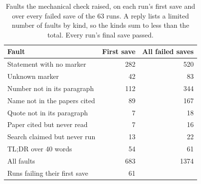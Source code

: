 \begin{table}[H]
\caption{Faults the mechanical check raised, on each run's first save and over every failed save of the 63 runs. A reply lists a limited number of faults by kind, so the kinds sum to less than the total. Every run's final save passed.}
\label{tab:faults}
\centering
\small
\setlength{\tabcolsep}{4pt}
\begin{tabular}{lrr}
\toprule
Fault & First save & All failed saves \\
\midrule
Statement with no marker & 282 & 520 \\
Unknown marker & 42 & 83 \\
Number not in its paragraph & 112 & 344 \\
Name not in the papers cited & 89 & 167 \\
Quote not in its paragraph & 7 & 18 \\
Paper cited but never read & 7 & 16 \\
Search claimed but never run & 13 & 22 \\
TL;DR over 40 words & 54 & 61 \\
\midrule
All faults & 683 & 1374 \\
Runs failing their first save & 61 & \\
\bottomrule
\end{tabular}
\end{table}
